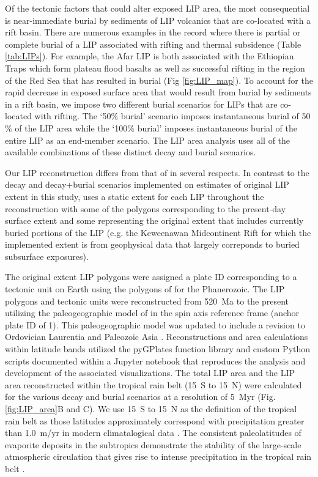 \documentclass[11pt,letterpaper]{article}
\begin{document}
Of the tectonic factors that could alter exposed LIP area, the most consequential is near-immediate burial by sediments of LIP volcanics that are co-located with a rift basin. There are numerous examples in the record where there is partial or complete burial of a LIP associated with rifting and thermal subsidence (Table \ref{tab:LIPs}). For example, the Afar LIP is both associated with the Ethiopian Traps which form plateau flood basalts as well as successful rifting in the region of the Red Sea that has resulted in burial (Fig \ref{fig:LIP_map}). To account for the rapid decrease in exposed surface area that would result from burial by sediments in a rift basin, we impose two different burial scenarios for LIPs that are co-located with rifting. The `50\% burial' scenario imposes instantaneous burial of 50$\%$ of the LIP area while the `100\% burial' imposes instantaneous burial of the entire LIP as an end-member scenario. The LIP area analysis uses all of the available combinations of these distinct decay and burial scenarios.

Our LIP reconstruction differs from that of \citet{Johansson2018a} in several respects. In contrast to the decay and decay+burial scenarios implemented on estimates of original LIP extent in this study, \citet{Johansson2018a} uses a static extent for each LIP throughout the reconstruction with some of the polygons corresponding to the present-day surface extent and some representing the original extent that includes currently buried portions of the LIP (e.g. the Keweenawan Midcontinent Rift for which the implemented extent is from geophysical data that largely correponds to buried subsurface exposures).

The original extent LIP polygons were assigned a plate ID corresponding to a tectonic unit on Earth using the polygons of \citet{Torsvik2016a} for the Phanerozoic. The LIP polygons and tectonic units were reconstructed from 520~Ma to the present utilizing the paleogeographic model of \citet{Torsvik2016a} in the spin axis reference frame (anchor plate ID of 1). This paleogeographic model was updated to include a revision to Ordovician Laurentia \citep{Swanson-Hysell2017a} and Paleozoic Asia \citep{Domeier2018a}. Reconstructions and area calculations within latitude bands utilized the pyGPlates function library and custom Python scripts documented within a Jupyter notebook that reproduces the analysis and development of the associated visualizations. The total LIP area and the LIP area reconstructed within the tropical rain belt (15\textdegree~S to 15\textdegree~N) were calculated for the various decay and burial scenarios at a resolution of 5~Myr (Fig. \ref{fig:LIP_area}B and C). We use 15\textdegree~S to 15\textdegree~N as the definition of the tropical rain belt as those latitudes approximately correspond with precipitation greater than 1.0~m/yr in modern climatalogical data \citep{Kalnay1996a}. The consistent paleolatitudes of evaporite deposits in the subtropics demonstrate the stability of the large-scale atmospheric circulation that gives rise to intense precipitation in the tropical rain belt \citep{Evans2006a}.
\end{document}
